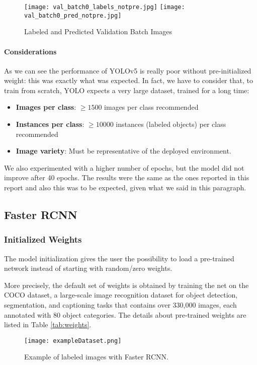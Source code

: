 \begin{figure}[h!]
  \centering
  \texttt{[image: val\_batch0\_labels\_notpre.jpg]}
  \texttt{[image: val\_batch0\_pred\_notpre.jpg]}
  \caption{Labeled and Predicted Validation Batch Images}
  \label{fig:in2}
\end{figure}

\newpage
\paragraph{Considerations}
As we can see the performance of YOLOv5 is really poor without pre-initialized weight: this was exactly what was expected. In fact, we have to consider that, to train from scratch, YOLO expects a very large dataset, trained for a long time: 
\begin{itemize}
    \item \textbf{Images per class}: $ \ge 1500$ images per class recommended
    \item \textbf{Instances per class}: $ \ge 10000$ instances (labeled objects) per class recommended
    \item \textbf{Image variety}: Must be representative of the deployed environment. 
\end{itemize}
We also experimented with a higher number of epochs, but the model did not improve after 40 epochs. The results were the same as the ones reported in this report and also this was to be expected, given what we said in this paragraph.

\subsection{Faster RCNN}
\subsubsection{Initialized Weights}
The model initialization gives the user the possibility to load a pre-trained network instead of starting with random/zero weights.

More precisely, the default set of weights is obtained by training the net on the COCO dataset, a large-scale image recognition dataset for object detection, segmentation, and captioning tasks that contains over 330,000 images, each annotated with 80 object categories.
The details about pre-trained weights are listed in Table \ref{tab:weights}.
\begin{figure}[h!]
  \centering
  \texttt{[image: exampleDataset.png]}
  \caption{Example of labeled images with Faster RCNN.}
  \label{fig:exampleDataset}
\end{figure}

